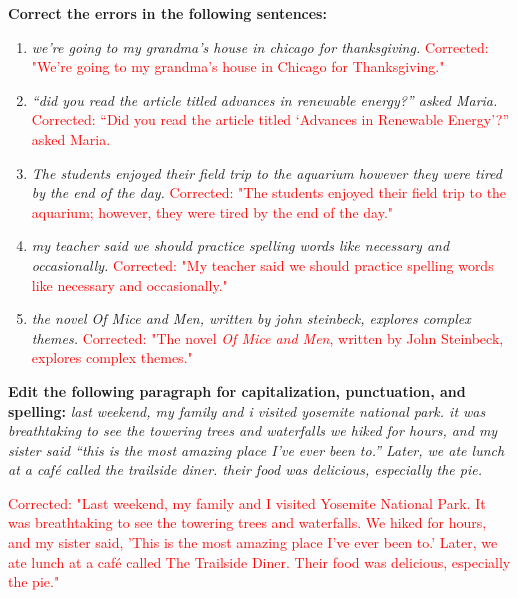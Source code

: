 \documentclass[12pt]{article}
\begin{document}
\begin{tcolorbox}[colframe=black!60, colback=white, 
coltitle=black, colbacktitle=black!15, fonttitle=\bfseries\Large, 
title=Guided Practice, halign title=center, left=10pt, right=10pt, top=10pt, bottom=15pt]
\textbf{Correct the errors in the following sentences:}
\begin{enumerate}[itemsep=3em]
    \item \textit{we’re going to my grandma's house in chicago for thanksgiving.}  
    \textcolor{red}{Corrected: "We’re going to my grandma's house in Chicago for Thanksgiving."}

    \item \textit{“did you read the article titled advances in renewable energy?” asked Maria.}  
    \textcolor{red}{Corrected: “Did you read the article titled ‘Advances in Renewable Energy’?” asked Maria.}

    \item \textit{The students enjoyed their field trip to the aquarium however they were tired by the end of the day.}  
    \textcolor{red}{Corrected: "The students enjoyed their field trip to the aquarium; however, they were tired by the end of the day."}

    \item \textit{my teacher said we should practice spelling words like necessary and occasionally.}  
    \textcolor{red}{Corrected: "My teacher said we should practice spelling words like necessary and occasionally."}

    \item \textit{the novel Of Mice and Men, written by john steinbeck, explores complex themes.}  
    \textcolor{red}{Corrected: "The novel \textit{Of Mice and Men}, written by John Steinbeck, explores complex themes."}
\end{enumerate}
\end{tcolorbox}

\vspace{1em}

\begin{tcolorbox}[colframe=black!60, colback=white, 
coltitle=black, colbacktitle=black!15, fonttitle=\bfseries\Large, 
title=Editing Exercises, halign title=center, left=10pt, right=10pt, top=10pt, bottom=15pt]
\textbf{Edit the following paragraph for capitalization, punctuation, and spelling:}
\vspace{1em}
\textit{last weekend, my family and i visited yosemite national park. it was breathtaking to see the towering trees and waterfalls we hiked for hours, and my sister said “this is the most amazing place I’ve ever been to.” Later, we ate lunch at a café called the trailside diner. their food was delicious, especially the pie.}

\textcolor{red}{Corrected: "Last weekend, my family and I visited Yosemite National Park. It was breathtaking to see the towering trees and waterfalls. We hiked for hours, and my sister said, 'This is the most amazing place I’ve ever been to.' Later, we ate lunch at a café called The Trailside Diner. Their food was delicious, especially the pie."}
\end{tcolorbox}
\end{document}
